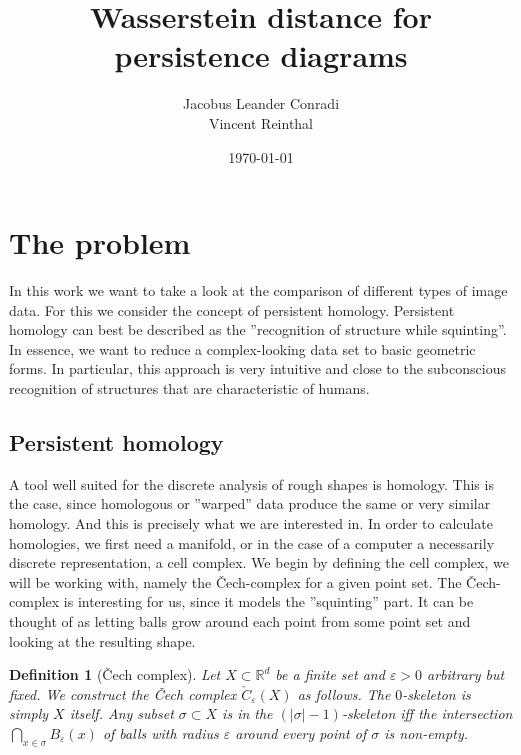 \documentclass[11pt, a4paper, UKenglish]{article}
\author{Jacobus Leander Conradi\\Vincent Reinthal}
\date{\today}
\title{Wasserstein distance for persistence diagrams}
\newtheorem{definition}{Definition}
\newcommand{\bR}{\mathbb{R}}
\begin{document}
    \maketitle

	
    \thispagestyle{plain}
    \addtocounter{page}{-1}
    \tableofcontents
    \vfil\null
    \clearpage
    \thispagestyle{empty}\mbox{}
    \clearpage

    \section{The problem}\label{sec:the-problem}
    In this work we want to take a look at the comparison of different types of image data.
    For this we consider the concept of persistent homology.
    Persistent homology can best be described as the ''recognition of structure while squinting''.
    In essence, we want to reduce a complex-looking data set to basic geometric forms.
    In particular, this approach is very intuitive and close to the subconscious recognition of structures that are characteristic of humans.


    \subsection{Persistent homology}\label{subsec:persistent-homology}
    A tool well suited for the discrete analysis of rough shapes is homology.
    This is the case, since homologous or ''warped'' data produce the same or very similar homology.
    And this is precisely what we are interested in.
    In order to calculate homologies, we first need a manifold, or in the case of a computer a necessarily discrete representation, a cell complex.
    We begin by defining the cell complex, we will be working with, namely the Čech-complex for a given point set.
    The Čech-complex is interesting for us, since it models the ''squinting'' part.
    It can be thought of as letting balls grow around each point from some point set and looking at the resulting shape.

    \begin{definition}[Čech complex]
        Let $X\subset \bR^d$ be a finite set and $\varepsilon>0$ arbitrary but fixed.
        We construct the Čech complex $\check C_\varepsilon(X)$ as follows.
        The $0$-skeleton is simply $X$ itself.
        Any subset $\sigma\subset X$ is in the $(|\sigma|-1)$-skeleton iff the intersection $\bigcap_{x\in\sigma}B_\varepsilon(x)$ of balls with radius $\varepsilon$ around every point of $\sigma$ is non-empty.
    \end{definition}
\end{document}
